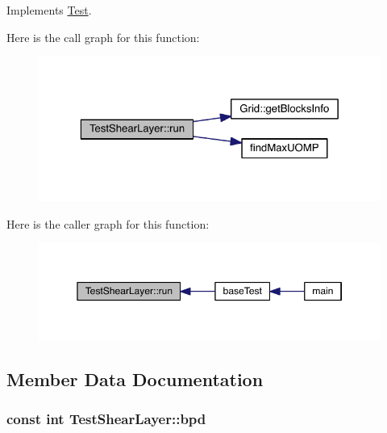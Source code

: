 Implements \hyperlink{class_test_a7e98fbe7ebf3acede5ee3fed91de3c6a}{Test}.



Here is the call graph for this function\+:\nopagebreak
\begin{figure}[H]
\begin{center}
\leavevmode
\includegraphics[width=323pt]{d4/d44/class_test_shear_layer_a87f2660d386c5929d05d273c8da364b5_cgraph}
\end{center}
\end{figure}




Here is the caller graph for this function\+:\nopagebreak
\begin{figure}[H]
\begin{center}
\leavevmode
\includegraphics[width=350pt]{d4/d44/class_test_shear_layer_a87f2660d386c5929d05d273c8da364b5_icgraph}
\end{center}
\end{figure}




\subsection{Member Data Documentation}
\hypertarget{class_test_shear_layer_aa786becaa4125bd36246994a2243359a}{}
\subsubsection[{bpd}]{\setlength{\rightskip}{0pt plus 5cm}const int Test\+Shear\+Layer\+::bpd\hspace{0.3cm}{\ttfamily [protected]}}\label{class_test_shear_layer_aa786becaa4125bd36246994a2243359a}
\hypertarget{class_test_shear_layer_a28767796bba8ba08d3ee8b0493240b89}{}
